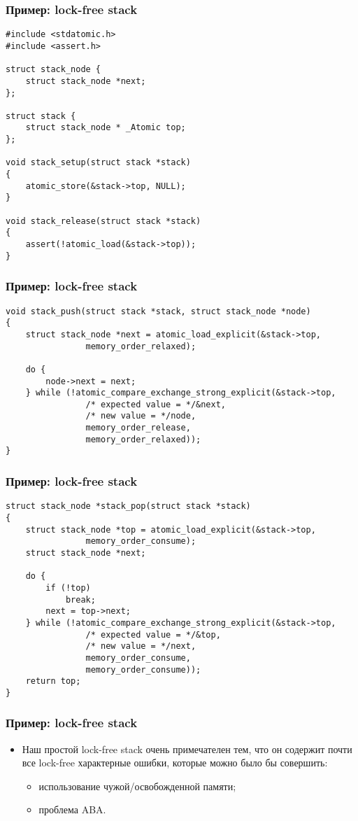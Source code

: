 \begin{frame}[fragile]
\frametitle{Пример: lock-free stack}
\begin{lstlisting}
#include <stdatomic.h>
#include <assert.h>

struct stack_node {
	struct stack_node *next;
};

struct stack {
	struct stack_node * _Atomic top;
};

void stack_setup(struct stack *stack)
{
	atomic_store(&stack->top, NULL);
}

void stack_release(struct stack *stack)
{
	assert(!atomic_load(&stack->top));
}
\end{lstlisting}
\end{frame}

\begin{frame}[fragile]
\frametitle{Пример: lock-free stack}
\begin{lstlisting}
void stack_push(struct stack *stack, struct stack_node *node)
{
	struct stack_node *next = atomic_load_explicit(&stack->top,
				memory_order_relaxed);

	do {
		node->next = next;
	} while (!atomic_compare_exchange_strong_explicit(&stack->top,
				/* expected value = */&next,
				/* new value = */node,
				memory_order_release,
				memory_order_relaxed));
}
\end{lstlisting}
\end{frame}

\begin{frame}[fragile]
\frametitle{Пример: lock-free stack}
\begin{lstlisting}
struct stack_node *stack_pop(struct stack *stack)
{
	struct stack_node *top = atomic_load_explicit(&stack->top,
				memory_order_consume);
	struct stack_node *next;

	do {
		if (!top)
			break;
		next = top->next;
	} while (!atomic_compare_exchange_strong_explicit(&stack->top,
				/* expected value = */&top,
				/* new value = */next,
				memory_order_consume,
				memory_order_consume));
	return top;
}
\end{lstlisting}
\end{frame}

\begin{frame}
\frametitle{Пример: lock-free stack}
\begin{itemize}
  \item Наш простой lock-free stack очень примечателен тем, что он содержит
  почти все lock-free характерные ошибки, которые можно было бы совершить:
  \begin{itemize}
    \item использование чужой/освобожденной памяти;
    \item проблема ABA.
  \end{itemize}
\end{itemize}
\end{frame}


